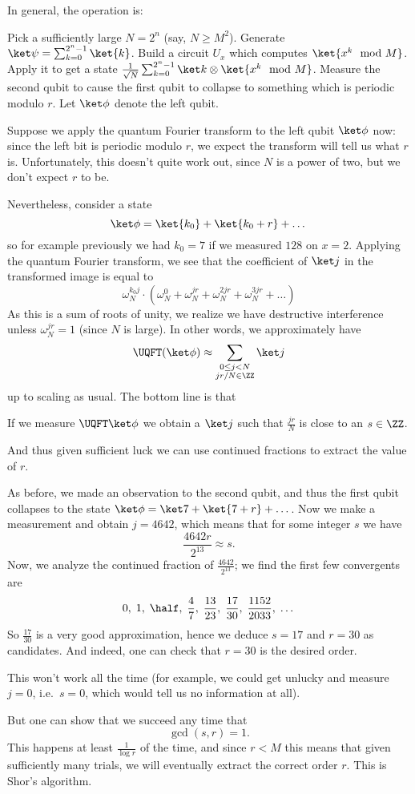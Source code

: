 In general, the operation is:
\begin{itemize}
	\ii Pick a sufficiently large $N = 2^n$ (say, $N \ge M^2$).
	\ii Generate $\ket\psi = \sum_{k=0}^{2^n-1} \ket{k}$.
	\ii Build a circuit $U_x$ which computes $\ket{x^k \mod M}$.
	\ii Apply it to get a state
	$\frac{1}{\sqrt N} \sum_{k=0}^{2^n-1} \ket k \otimes \ket{x^k \mod M}$.
	\ii Measure the second qubit to cause the first qubit to
	collapse to something which is periodic modulo $r$.
	Let $\ket\phi$ denote the left qubit.
\end{itemize}

Suppose we apply the quantum Fourier transform to the left qubit $\ket\phi$ now:
since the left bit is periodic modulo $r$, we expect the transform
will tell us what $r$ is.
Unfortunately, this doesn't quite work out, since $N$ is a power of two,
but we don't expect $r$ to be.

Nevertheless, consider a state
\[ \ket\phi = \ket{k_0} + \ket{k_0+r} + \dots \]
so for example previously we had $k_0=7$ if we measured $128$ on $x=2$.
Applying the quantum Fourier transform, we see that the
coefficient of $\ket j$ in the transformed image is equal to
\[
	\omega_N^{k_0j} \cdot
	\left( \omega_N^{0} + \omega_N^{jr} + \omega_N^{2jr}
	+ \omega_N^{3jr} + \dots \right)
\]
As this is a sum of roots of unity, we realize we have
destructive interference unless $\omega_N^{jr} = 1$ (since $N$ is large).
In other words, we approximately have
\[
	\UQFT(\ket\phi)
	\approx
	\sum_{\substack{0 \le j < N \\ jr/N \in \ZZ}} \ket j
\]
up to scaling as usual.
The bottom line is that
\begin{moral}
	If we measure $\UQFT\ket\phi$ we obtain a $\ket j$ such that
	$\frac{jr}{N}$ is close to an $s \in \ZZ$.
\end{moral}
And thus given sufficient luck we can use continued fractions
to extract the value of $r$.

\begin{example}
	[Finishing the factoring of $M = 77$]
	As before, we made an observation to the second qubit,
	and thus the first qubit collapses to the state
	$\ket\phi = \ket7 + \ket{7+r} + \dots$.
	Now we make a measurement and obtain $j = 4642$, which means that
	for some integer $s$ we have
	\[ \frac{4642r}{2^{13}} \approx s. \]
	Now, we analyze the continued fraction of $\frac{4642}{2^{13}}$;
	we find the first few convergents are
	\[
		0, \;
		1, \;
		\half, \;
		\frac{4}{7}, \;
		\frac{13}{23}, \;
		\frac{17}{30}, \;
		\frac{1152}{2033}, \;
		\dots
	\]
	So $\frac{17}{30}$ is a very good approximation,
	hence we deduce $s = 17$ and $r = 30$ as candidates.
	And indeed, one can check that $r = 30$ is the desired order.
\end{example}

This won't work all the time (for example, we could get unlucky and
measure $j=0$, i.e.\ $s=0$, which would tell us no information at all).

But one can show that we succeed any time that \[ \gcd(s,r) = 1. \]
This happens at least $\frac{1}{\log r}$ of the time,
and since $r < M$ this means that given sufficiently many trials,
we will eventually extract the correct order $r$.
This is Shor's algorithm.
